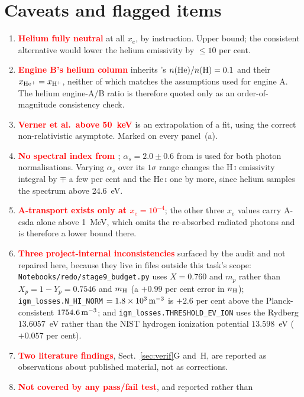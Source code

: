 \documentclass[11pt,a4paper]{article}
\newcommand{\flag}[1]{\textbf{\textcolor{red}{#1}}}
\begin{document}
\section{Caveats and flagged items}\label{sec:caveats}
\begin{enumerate}\itemsep3pt
\item \flag{Helium fully neutral} at all $x_e$, by instruction.  Upper bound;
  the consistent alternative would lower the helium emissivity by
  $\le10$ per cent.
\item \flag{Engine B's helium column} inherits
  \citeauthor{ShullVanSteenberg1985}'s $n({\rm He})/n({\rm H})=0.1$ and their
  $x_{\rm He^+}=x_{\rm H^+}$, neither of which matches the assumptions used
  for engine A.  The helium engine-A/B ratio is therefore quoted only as an
  order-of-magnitude consistency check.
\item \flag{Verner et al.\ above 50~keV} is an extrapolation of a fit, using
  the correct non-relativistic asymptote.  Marked on every panel~(a).
\item \flag{No spectral index from \citet{Giovinazzo2026}}; $\alpha_s=2.0\pm0.6$
  from \citet{Gaikwad2023} is used for both photon normalisations.  Varying
  $\alpha_s$ over its $1\sigma$ range changes the H\,\textsc{i} emissivity
  integral by $\mp$ a few per cent and the He\,\textsc{i} one by more, since
  helium samples the spectrum above 24.6~eV.
\item \flag{A-transport exists only at $x_e=10^{-4}$}; the other three $x_e$
  values carry A-csda alone above 1~MeV, which omits the re-absorbed radiated
  photons and is therefore a lower bound there.
\item \flag{Three project-internal inconsistencies} surfaced by the audit and
  not repaired here, because they live in files outside this task's scope:
  \texttt{Notebooks/redo/stage9\_budget.py} uses $X=0.760$ and $m_p$ rather
  than $X_p = 1-Y_p = 0.7546$ and $m_{\rm H}$ (a $+0.99$ per cent error in
  $n_{\rm H}$); \texttt{igm\_losses.N\_HI\_NORM} $=1.8\times10^{3}\,{\rm
  m^{-3}}$ is $+2.6$ per cent above the Planck-consistent
  $1754.6\,{\rm m^{-3}}$; and \texttt{igm\_losses.THRESHOLD\_EV\_ION} uses the
  Rydberg $13.6057$~eV rather than the NIST hydrogen ionization potential
  $13.598$~eV ($+0.057$ per cent).
\item \flag{Two literature findings}, Sect.~\ref{sec:verif}G and~H, are
  reported as observations about published material, not as corrections.
\item \flag{Not covered by any pass/fail test}, and reported rather than

\end{enumerate}
\end{document}
